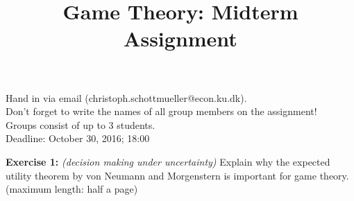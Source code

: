 \documentclass[12pt,english,a4paper]{article}
\title{Game Theory: Midterm Assignment}
\date{}
\theoremstyle{plain}
\begin{document}
\maketitle

\vspace*{-2cm}
\begin{large}
  \begin{center}
    Hand in via email (christoph.schottmueller@econ.ku.dk). \\
    Don't forget to write the names of all group members on the assignment!\\
    Groups consist of up to 3 students.\\
    Deadline: October 30, 2016; 18:00
  \end{center}
\end{large}

\textbf{Exercise 1: }\emph{(decision making under uncertainty)} Explain why the expected utility theorem by von Neumann and Morgenstern is important for game theory. (maximum length: half a page)


\end{document}
